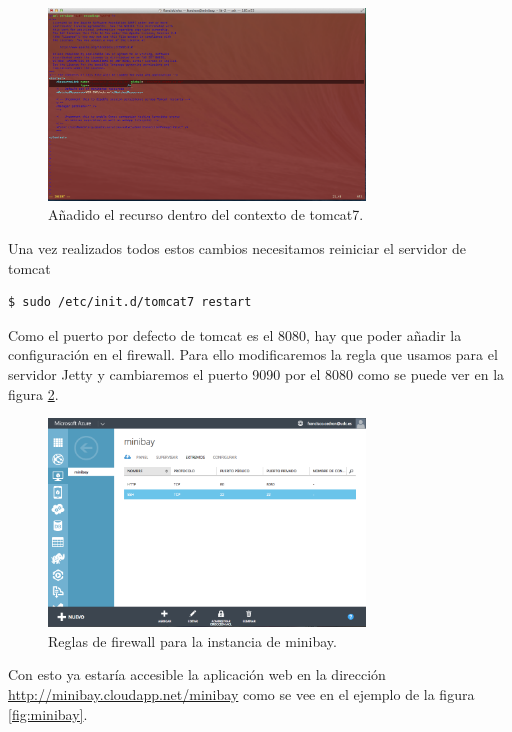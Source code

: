 \documentclass{article}
\begin{document}
\begin{figure}[h]
  \centering
    \includegraphics[width=0.75\textwidth]{img/p023.png}
  \caption{Añadido el recurso dentro del contexto de tomcat7.}
  \label{fig:tomcatResource}
\end{figure}

Una vez realizados todos estos cambios necesitamos reiniciar el servidor de tomcat
\begin{lstlisting}[style=miniBash]
$ sudo /etc/init.d/tomcat7 restart
\end{lstlisting}	

	Como el puerto por defecto de tomcat es el 8080, hay que poder añadir la configuración en el firewall. Para ello modificaremos la regla que usamos para el servidor Jetty y cambiaremos el puerto 9090 por el 8080 como se puede ver en la figura \ref{fig:minibayFirewallTomcat}.

\begin{figure}[h]
  \centering
    \includegraphics[width=0.75\textwidth]{img/p026.png}
  \caption{Reglas de firewall para la instancia de minibay.}
  \label{fig:minibayFirewallTomcat}
\end{figure}

	Con esto ya estaría accesible la aplicación web en la dirección \url{http://minibay.cloudapp.net/minibay} como se vee en el ejemplo de la figura \ref{fig:minibay}.
\end{document}
